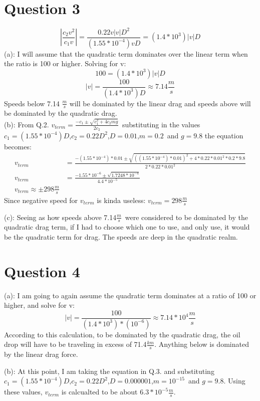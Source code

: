 \documentclass[a4paper,12pt]{article}
\begin{document}
\section*{Question 3}
\[\left|\frac{c_2v^2}{c_1v}\right|=\frac{0.22v\left|v\right|D^2}{(1.55\ast10^{-4})vD}=(1.4\ast10^3)\left|v\right|D\](a):
I
will assume that the quadratic term dominates over the linear term
when the ratio is 100 or higher.  Solving for v:
\[100=(1.4\ast10^3)\left|v\right|D\]
\[\left|v\right|=\frac{100}{(1.4\ast10^3)D}\approx7.14\frac{m}{s}\]
Speeds below 7.14 $\frac{m}{s}$ will be dominated by the linear drag
and speeds above will be dominated by the quadratic drag.\\
(b): From
Q.2. $v_{term}=\frac{-c_1\pm\sqrt{c_1^2+4c_2mg}}{2c_2}$\ substituting
in the values
$c_1=(1.55\ast10^{-4})D$,$c_2=0.22D^2$,$D=0.01$,$m=0.2$\ and $g=9.8$ the
equation becomes:
\begin{align*}
v_{term}&=\frac{-(1.55\ast10^{-4})\ast0.01\pm\sqrt{((1.55\ast10^{-4})\ast0.01)^2+4\ast0.22\ast0.01^2\ast0.2\ast9.8}}{2\ast0.22\ast0.01^2}\\
v_{term}&=\frac{-1.55*10^{-6}\pm\sqrt{1.7248*10^{-4}}}{4.4*10^{-5}}\\
v_{term}\approx\pm298\frac{m}{s}
\end{align*}
Since negative speed for $v_{term}$ is kinda useless:
$v_{term}=298\frac{m}{s}$

(c): Seeing as how speeds above 7.14$\frac{m}{s}$\ were considered to
be dominated by the quadratic drag term, if I had to choose which one
to use, and only use, it would be the quadratic term for drag.  The
speeds are deep in the quadratic realm.

\section*{Question 4}
(a): I am going to again assume the quadratic term dominates at a
ratio of 100 or higher, and solve for v:
\[\left|v\right| =
\frac{100}{(1.4\ast10^3)\ast(10^{-6})}\approx7.14*10^4\frac{m}{s}\]
According to this calculation, to be dominated by the quadratic drag,
the oil drop will have to be traveling in excess of
71.4$\frac{km}{s}$.  Anything below is dominated by the linear drag
force.

(b): At this point, I am taking the equation in Q.3. and substituting
$c_1=(1.55\ast10^{-4})D$,$c_2=0.22D^2$,$D=0.000001$,$m=10^{-15}$\ and
$g=9.8$.  Using these values, $v_{term}$ is calcualted to be about
$6.3*10^{-5}\frac{m}{s}$.
\end{document}
